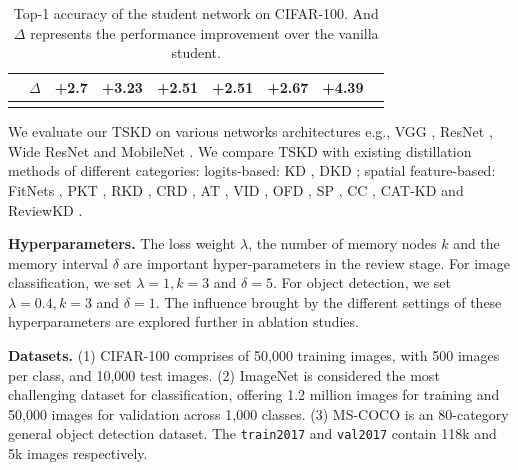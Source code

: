 \documentclass[letterpaper]{article} %
\begin{document}
\begin{table}[htbp]
\begin{tabular}{@{}ccccccccc@{}}
& $\Delta$ & \textcolor[RGB]{0, 155, 0}{+2.7} &\textcolor[RGB]{0, 155, 0}{+3.23} &\textcolor[RGB]{0, 155, 0}{+2.51} &\textcolor[RGB]{0, 155, 0}{+2.51} &\textcolor[RGB]{0, 155, 0}{+2.67} &\textcolor[RGB]{0, 155, 0}{+4.39}\\
\bottomrule
\hspace*{\fill} \\
\end{tabular}
\vspace{-2pt}
\caption{Top-1 accuracy of the student network on CIFAR-100. And $\Delta$ represents the performance improvement over the vanilla student.}
\label{cifar100samestyle}
\end{table}

We evaluate our TSKD on various networks architectures e.g., VGG \cite{simonyan2014very}, ResNet \cite{he2016deep}, Wide ResNet \cite{zagoruyko2016wide} and MobileNet \cite{sandler2018mobilenetv2}. We compare TSKD with existing distillation methods of different categories: logits-based: KD \cite{hinton2015distilling}, DKD \cite{zhao2022decoupled}; spatial feature-based: FitNets \cite{romero2014fitnets}, PKT \cite{passalis2018probabilistic}, RKD \cite{park2019relational}, CRD \cite{tian2019contrastive}, AT \cite{zagoruyko2016paying}, VID \cite{ahn2019variational}, OFD \cite{heo2019comprehensive}, SP \cite{tung2019similarity}, CC \cite{peng2019correlation}, CAT-KD \cite{guo2023class} and ReviewKD \cite{chen2021distilling}.

\noindent\textbf{Hyperparameters.} The loss weight $\lambda$, the number of memory nodes $k$ and the memory interval $\delta$ are important hyper-parameters in the review stage. For image classification, we set $\lambda = 1,k=3$ and $\delta=5$. For object detection, we set $\lambda = 0.4, k=3$ and $\delta = 1$. The influence brought by the different settings of these hyperparameters are explored further in ablation studies. 


\noindent\textbf{Datasets.} (1) CIFAR-100 \cite{krizhevsky2009learning} comprises of 50,000 training images, with 500 images per class, and 10,000 test images. (2) ImageNet \cite{deng2009imagenet} is considered the most challenging dataset for classification, offering 1.2 million images for training and 50,000 images for validation across 1,000 classes. (3) MS-COCO \cite{lin2014microsoft} is an 80-category general object detection dataset. The \texttt{train2017} and \texttt{val2017} contain 118k and 5k images respectively.
\end{document}
